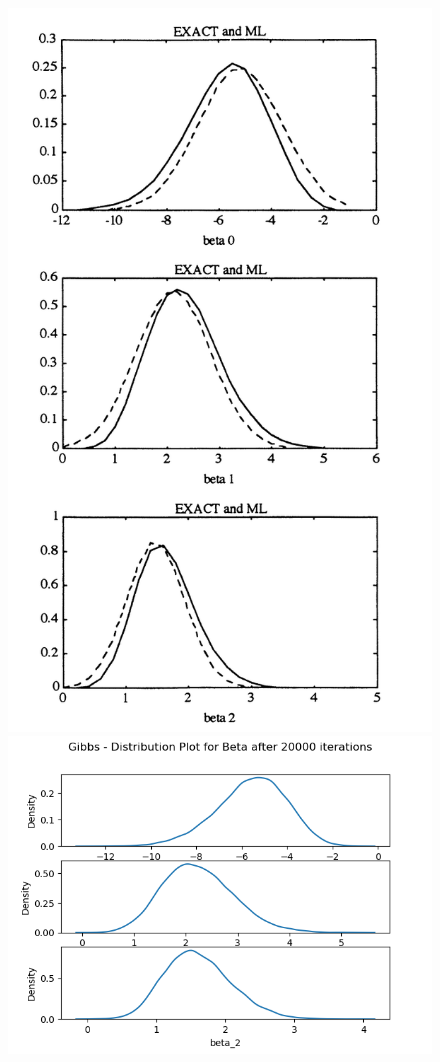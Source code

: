 \documentclass{article}
\begin{document}
\begin{figure}[htp]
    \centering
    \includegraphics[scale=0.41]{images/albert_chibb.png}
    \includegraphics[scale=0.41]{images/dist_gibbs_noinfo_20000_warmup_0.png}

\end{figure}
\end{document}
